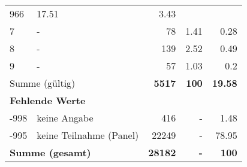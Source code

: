 \begin{longtable}{lXrrr}
       \num{966} &
       \num[round-mode=places,round-precision=2]{17,51} &
         \num[round-mode=places,round-precision=2]{3,43} \\

     7 &
     \multicolumn{1}{X}{ -  } &


       \num{78} &
       \num[round-mode=places,round-precision=2]{1,41} &
         \num[round-mode=places,round-precision=2]{0,28} \\

     8 &
     \multicolumn{1}{X}{ -  } &


       \num{139} &
       \num[round-mode=places,round-precision=2]{2,52} &
         \num[round-mode=places,round-precision=2]{0,49} \\

     9 &
     \multicolumn{1}{X}{ -  } &


       \num{57} &
       \num[round-mode=places,round-precision=2]{1,03} &
         \num[round-mode=places,round-precision=2]{0,2} \\
     \midrule
     \multicolumn{2}{l}{Summe (gültig)} &
       \textbf{\num{5517}} &
     \textbf{100} &
       \textbf{\num[round-mode=places,round-precision=2]{19,58}} \\
     \multicolumn{5}{l}{\textbf{Fehlende Werte}}\\
       -998 &
       keine Angabe &
         \num{416} &
        - &
         \num[round-mode=places,round-precision=2]{1,48} \\
       -995 &
       keine Teilnahme (Panel) &
         \num{22249} &
        - &
         \num[round-mode=places,round-precision=2]{78,95} \\
     \midrule
     \multicolumn{2}{l}{\textbf{Summe (gesamt)}} &
          \textbf{\num{28182}} &
        \textbf{-} &
        \textbf{100} \\
     \bottomrule
     \end{longtable}
     
